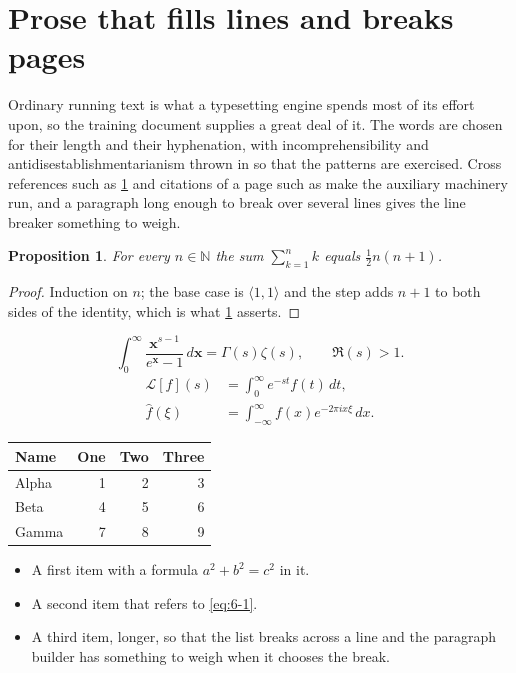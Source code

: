 \documentclass[11pt,a4paper]{report}
\theoremstyle{plain}
\newtheorem{proposition}{Proposition}[chapter]
\newcommand{\vecn}[1]{\mathbf{#1}}
\newcommand{\pairs}[2]{\langle #1,#2\rangle}
\begin{document}
\section{Prose that fills lines and breaks pages}
\label{sec:prose6-1}
Ordinary running text is what a typesetting engine spends most of its effort
upon, so the training document supplies a great deal of it. The words are
chosen for their length and their hyphenation, with incomprehensibility and
antidisestablishmentarianism thrown in so that the patterns are exercised.
Cross references such as \cref{sec:prose6-1} and citations of a page such
as \pageref{sec:prose6-1} make the auxiliary machinery run, and a
paragraph long enough to break over several lines gives the line breaker
something to weigh.
\begin{proposition}\label{prop:6-1}
For every $n\in\mathbb{N}$ the sum $\sum_{k=1}^{n}k$ equals
$\tfrac{1}{2}n(n+1)$.
\end{proposition}
\begin{proof}
Induction on $n$; the base case is $\pairs{1}{1}$ and the step adds $n+1$ to
both sides of the identity, which is what \cref{prop:6-1} asserts.
\end{proof}
\begin{equation}\label{eq:6-1}
  \int_{0}^{\infty}\frac{\vecn{x}^{s-1}}{e^{\vecn{x}}-1}\,d\vecn{x}
    = \Gamma(s)\zeta(s),\qquad \Re(s)>1 .
\end{equation}
\begin{align}
  \mathcal{L}[f](s) &= \int_{0}^{\infty} e^{-st} f(t)\,dt, \\
  \widehat{f}(\xi)  &= \int_{-\infty}^{\infty} f(x) e^{-2\pi i x\xi}\,dx .
\end{align}
\par\noindent\begin{center}
\begin{tabular}{lrrr}
\hline
Name & One & Two & Three \\
\hline
Alpha & 1 & 2 & 3 \\
Beta & 4 & 5 & 6 \\
Gamma & 7 & 8 & 9 \\
\hline
\end{tabular}
\end{center}
\begin{itemize}
  \item A first item with a formula $a^2+b^2=c^2$ in it.
  \item A second item that refers to \eqref{eq:6-1}.
  \item A third item, longer, so that the list breaks across a line and the
    paragraph builder has something to weigh when it chooses the break.
\end{itemize}
\end{document}

